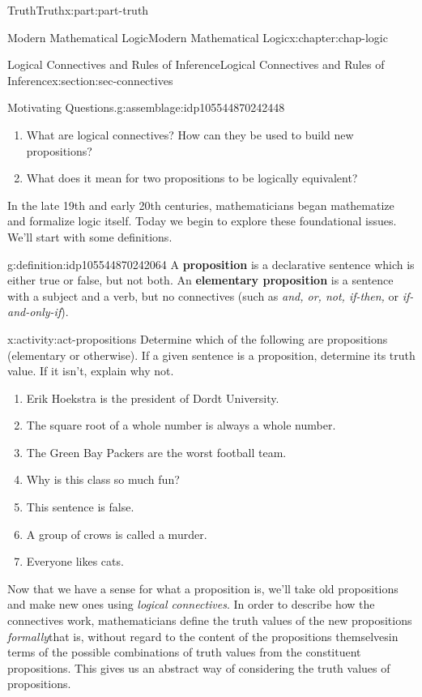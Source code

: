\documentclass[oneside,10pt,]{book}
\newcommand{\terminology}[1]{\textbf{#1}}
\numberwithin{equation}{section}
\begin{document}
\begin{partptx}{Truth}{}{Truth}{}{}{x:part:part-truth}
\begin{chapterptx}{Modern Mathematical Logic}{}{Modern Mathematical Logic}{}{}{x:chapter:chap-logic}
\begin{sectionptx}{Logical Connectives and Rules of Inference}{}{Logical Connectives and Rules of Inference}{}{}{x:section:sec-connectives}
\begin{assemblage}{Motivating Questions.}{g:assemblage:idp105544870242448}
\begin{enumerate}
\item{}What are logical connectives? How can they be used to build new propositions?%
\item{}What does it mean for two propositions to be logically equivalent?%
\end{enumerate}
%
\end{assemblage}
In the late 19th and early 20th centuries, mathematicians began mathematize and formalize logic itself. Today we begin to explore these foundational issues. We'll start with some definitions.%
\begin{definition}{}{g:definition:idp105544870242064}%
%
%
%
A \terminology{proposition} is a declarative sentence which is either true or false, but not both. An \terminology{elementary proposition} is a sentence with a subject and a verb, but no connectives (such as \emph{and, or, not, if-then,} or \emph{if-and-only-if}).%
\end{definition}
\begin{activity}{}{x:activity:act-propositions}%
Determine which of the following are propositions (elementary or otherwise). If a given sentence is a proposition, determine its truth value. If it isn't, explain why not.%
%
\begin{enumerate}
\item{}Erik Hoekstra is the president of Dordt University.%
\item{}The square root of a whole number is always a whole number.%
\item{}The Green Bay Packers are the worst football team.%
\item{}Why is this class so much fun?%
\item{}This sentence is false.%
\item{}A group of crows is called a murder.%
\item{}Everyone likes cats.%
\end{enumerate}
\end{activity}%
Now that we have a sense for what a proposition is, we'll take old propositions and make new ones using \emph{logical connectives}. In order to describe how the connectives work, mathematicians define the truth values of the new propositions \emph{formally}\textemdash{}that is, without regard to the content of the propositions themselves\textemdash{}in terms of the possible combinations of truth values from the constituent propositions. This gives us an abstract way of considering the truth values of propositions.%

\end{sectionptx}
\end{chapterptx}
\end{partptx}
\end{document}
